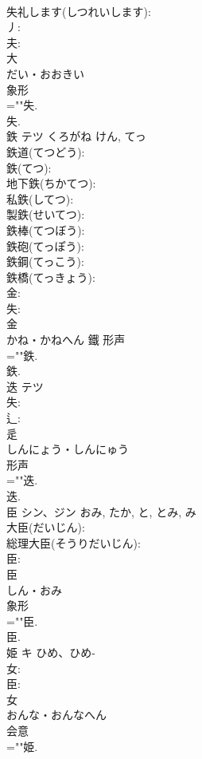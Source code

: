 \documentclass[8pt]{extreport}
\begin{document}
\begin{CJK}{UTF8}{min}
\\	失礼します(しつれいします): 
\\	丿: 
\\	夫: 
\\	大	
\\	だい・おおきい	
\\	象形 
\\	=""失.
\\	失.
\\	鉄	テツ	くろがね	けん, てっ	
\\	鉄道(てつどう): 
\\	鉄(てつ): 
\\	地下鉄(ちかてつ): 
\\	私鉄(してつ): 
\\	製鉄(せいてつ): 
\\	鉄棒(てつぼう): 
\\	鉄砲(てっぽう): 
\\	鉄鋼(てっこう): 
\\	鉄橋(てっきょう): 
\\	金: 
\\	失: 
\\	金	
\\	かね・かねへん	鐵	形声 
\\	=""鉄.
\\	鉄.
\\	迭	テツ			
\\	失: 
\\	辶: 
\\	辵	
\\	しんにょう・しんにゅう	
\\	形声 
\\	=""迭.
\\	迭.
\\	臣	シン、ジン		おみ, たか, と, とみ, み	
\\	大臣(だいじん): 
\\	総理大臣(そうりだいじん): 
\\	臣: 
\\	臣	
\\	しん・おみ	
\\	象形 
\\	=""臣.
\\	臣.
\\	姫	キ	ひめ、ひめ-		
\\	女: 
\\	臣: 
\\	女	
\\	おんな・おんなへん	
\\	会意 
\\	=""姫.

\end{CJK}
\end{document}
